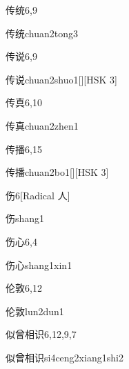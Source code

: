 \begin{entry}{传统}{6,9}
  \begin{phonetics}{传统}{chuan2tong3}
  \end{phonetics}
\end{entry}

\begin{entry}{传说}{6,9}
  \begin{phonetics}{传说}{chuan2shuo1}[][HSK 3]
  \end{phonetics}
\end{entry}

\begin{entry}{传真}{6,10}
  \begin{phonetics}{传真}{chuan2zhen1}
  \end{phonetics}
\end{entry}

\begin{entry}{传播}{6,15}
  \begin{phonetics}{传播}{chuan2bo1}[][HSK 3]
  \end{phonetics}
\end{entry}

\begin{entry}{伤}{6}[Radical 人]
  \begin{phonetics}{伤}{shang1}
  \end{phonetics}
\end{entry}

\begin{entry}{伤心}{6,4}
  \begin{phonetics}{伤心}{shang1xin1}
  \end{phonetics}
\end{entry}

\begin{entry}{伦敦}{6,12}
  \begin{phonetics}{伦敦}{lun2dun1}
  \end{phonetics}
\end{entry}

\begin{entry}{似曾相识}{6,12,9,7}
  \begin{phonetics}{似曾相识}{si4ceng2xiang1shi2}
  \end{phonetics}
\end{entry}


